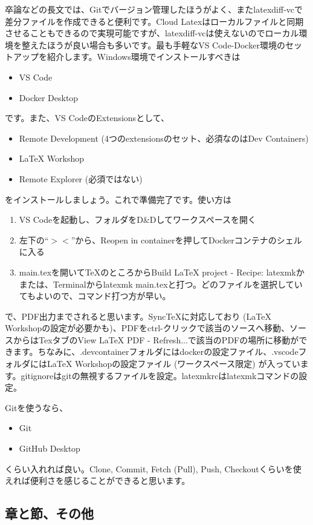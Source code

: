 \documentclass[uplatex,dvipdfmx,a4j,11pt]{jsarticle}
\begin{document}
卒論などの長文では、Gitでバージョン管理したほうがよく、またlatexdiff-vcで差分ファイルを作成できると便利です。Cloud Latexはローカルファイルと同期させることもできるので実現可能ですが、latexdiff-vcは使えないのでローカル環境を整えたほうが良い場合も多いです。最も手軽なVS Code-Docker環境のセットアップを紹介します。Windows環境でインストールすべきは
\begin{itemize}
  \item VS Code
  \item Docker Desktop
\end{itemize}
です。また、VS CodeのExtensionsとして、
\begin{itemize}
  \item Remote Development (4つのextensionsのセット、必須なのはDev Containers)
  \item LaTeX Workshop
  \item Remote Explorer (必須ではない)
\end{itemize}
をインストールしましょう。これで準備完了です。使い方は
\begin{enumerate}
  \item VS Codeを起動し、フォルダをD\&Dしてワークスペースを開く
  \item 左下の``$><$''から、Reopen in containerを押してDockerコンテナのシェルに入る
  \item main.texを開いて\TeX のところからBuild LaTeX project - Recipe: latexmkかまたは、Terminalからlatexmk main.texと打つ。どのファイルを選択していてもよいので、コマンド打つ方が早い。
\end{enumerate}
で、PDF出力までされると思います。SyncTeXに対応しており (LaTeX Workshopの設定が必要かも)、PDFをctrl-クリックで該当のソースへ移動、ソースからはTexタブのView LaTeX PDF - Refresh...で該当のPDFの場所に移動ができます。ちなみに、.devcontainerフォルダにはdockerの設定ファイル、.vscodeフォルダにはLaTeX Workshopの設定ファイル (ワークスペース限定) が入っています。gitignoreはgitの無視するファイルを設定。latexmkrcはlatexmkコマンドの設定。

Gitを使うなら、
\begin{itemize}
  \item Git
  \item GitHub Desktop
\end{itemize}
くらい入れれば良い。Clone, Commit, Fetch (Pull), Push, Checkoutくらいを使えれば便利さを感じることができると思います。

\subsection{章と節、その他}
\end{document}
